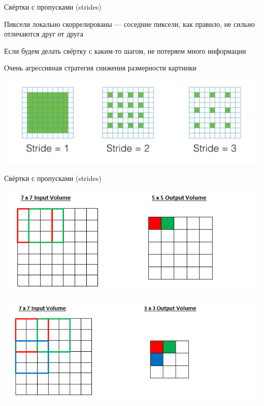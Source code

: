 \documentclass[notes,12pt, aspectratio=169]{beamer}
\newenvironment{wideitemize}{\itemize\addtolength{\itemsep}{10pt}}{\enditemize}
\begin{document}
\begin{frame}{Свёртки с пропусками (strides)}
	\begin{wideitemize}
		\item Пиксели локально скоррелированы — соседние пиксели, как правило, не сильно отличаются друг от друга	
		\item  Если будем делать свёртку с каким-то шагом, не потеряем много информации
		\item  \alert{Очень агрессивная стратегия снижения размерности картинки}
	\end{wideitemize}
	\begin{center}
		\includegraphics[width=.8\linewidth]{stride.png}
	\end{center}
\end{frame}


\begin{frame}{Свёртки с пропусками (strides)}
\begin{center}
	\includegraphics[width=.6\linewidth]{Stride1.png}
\end{center}
\vfill
\begin{center}
	\includegraphics[width=.6\linewidth]{Stride2.png}
\end{center}
\end{frame}
\end{document}
